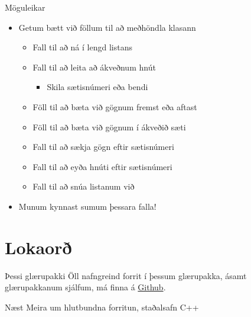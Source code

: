 \documentclass{beamer}
\begin{document}
\begin{frame}{Möguleikar}
    \begin{itemize}
        \item Getum bætt við föllum til að meðhöndla klasann
        \begin{itemize}
            \item Fall til að ná í lengd listans
            \item Fall til að leita að ákveðnum hnút 
            \begin{itemize}
                \item Skila sætisnúmeri eða bendi \pause
            \end{itemize}
            \item Föll til að bæta við gögnum fremst eða aftast \pause
            \item Föll til að bæta við gögnum í ákveðið sæti \pause
            \item Fall til að sækja gögn eftir sætisnúmeri \pause
            \item Fall til að eyða hnúti eftir sætisnúmeri \pause
            \item Fall til að snúa listanum við \pause
        \end{itemize}
        \item Munum kynnast sumum þessara falla!
    \end{itemize}
\end{frame}

\section{Lokaorð}

\begin{frame}{Þessi glærupakki}
    Öll nafngreind forrit í þessum glærupakka, ásamt glærupakkanum sjálfum, má finna á  \href{https://github.com/Ernir/kennsluefni/tree/master/T2/Code/w2}{Github}.
\end{frame}

\begin{frame}{Næst}
Meira um hlutbundna forritun, staðalsafn C++
\end{frame}
\end{document}
